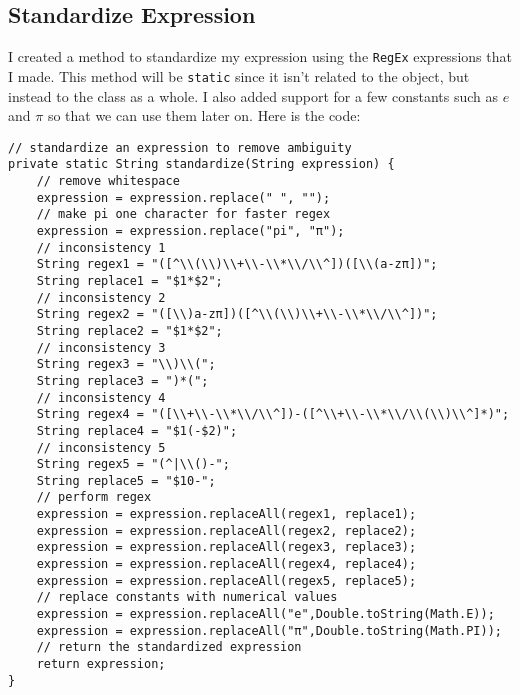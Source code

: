 \documentclass[../../../../main.tex]{subfiles}
\begin{document}
\subsection{Standardize Expression}
I created a method to standardize my expression using the \texttt{RegEx} expressions that I made. This method will be \texttt{static} since it isn't related to the object, but instead to the class as a whole. I also added support for a few constants such as $e$ and $\pi$ so that we can use them later on. Here is the code:
\begin{verbatim}
// standardize an expression to remove ambiguity
private static String standardize(String expression) {
	// remove whitespace
	expression = expression.replace(" ", "");
	// make pi one character for faster regex
	expression = expression.replace("pi", "π");
	// inconsistency 1
	String regex1 = "([^\\(\\)\\+\\-\\*\\/\\^])([\\(a-zπ])";
	String replace1 = "$1*$2";
	// inconsistency 2
	String regex2 = "([\\)a-zπ])([^\\(\\)\\+\\-\\*\\/\\^])";
	String replace2 = "$1*$2";
	// inconsistency 3
	String regex3 = "\\)\\(";
	String replace3 = ")*(";
	// inconsistency 4
	String regex4 = "([\\+\\-\\*\\/\\^])-([^\\+\\-\\*\\/\\(\\)\\^]*)";
	String replace4 = "$1(-$2)";
	// inconsistency 5
	String regex5 = "(^|\\()-";
	String replace5 = "$10-";
	// perform regex
	expression = expression.replaceAll(regex1, replace1);
	expression = expression.replaceAll(regex2, replace2);
	expression = expression.replaceAll(regex3, replace3);
	expression = expression.replaceAll(regex4, replace4);
	expression = expression.replaceAll(regex5, replace5);
	// replace constants with numerical values
	expression = expression.replaceAll("e",Double.toString(Math.E));
	expression = expression.replaceAll("π",Double.toString(Math.PI));
	// return the standardized expression
	return expression;
}
\end{verbatim}
\end{document}
